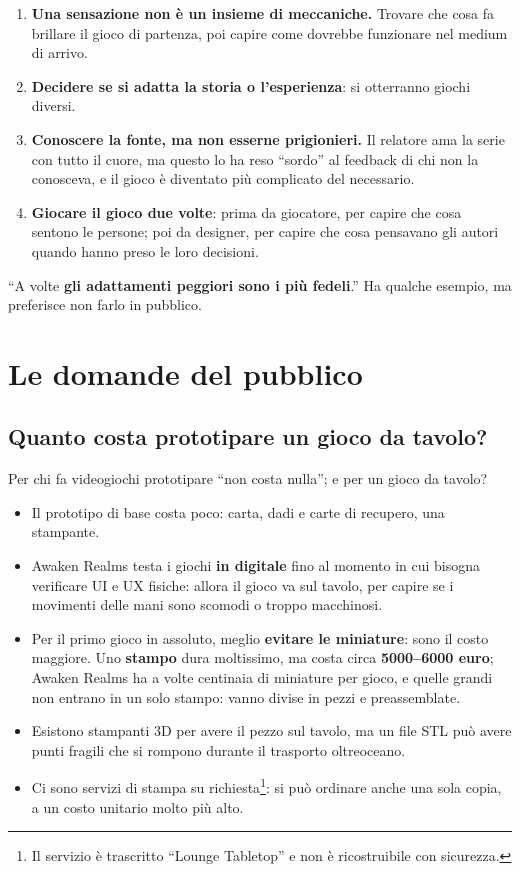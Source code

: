 \begin{enumerate}
  \item \textbf{Una sensazione non è un insieme di meccaniche.} Trovare che cosa fa
        brillare il gioco di partenza, poi capire come dovrebbe funzionare nel medium
        di arrivo.
  \item \textbf{Decidere se si adatta la storia o l'esperienza}: si otterranno giochi
        diversi.
  \item \textbf{Conoscere la fonte, ma non esserne prigionieri.} Il relatore ama la
        serie con tutto il cuore, ma questo lo ha reso ``sordo'' al feedback di chi
        non la conosceva, e il gioco è diventato più complicato del necessario.
  \item \textbf{Giocare il gioco due volte}: prima da giocatore, per capire che cosa
        sentono le persone; poi da designer, per capire che cosa pensavano gli
        autori quando hanno preso le loro decisioni.
\end{enumerate}
``A volte \textbf{gli adattamenti peggiori sono i più fedeli}.'' Ha qualche esempio,
ma preferisce non farlo in pubblico.

\section{Le domande del pubblico}
\label{sec:c3-5-domande}

\subsection{Quanto costa prototipare un gioco da tavolo?}

Per chi fa videogiochi prototipare ``non costa nulla''; e per un gioco da tavolo?
\begin{itemize}
  \item Il prototipo di base costa poco: carta, dadi e carte di recupero, una
        stampante.
  \item Awaken Realms testa i giochi \textbf{in digitale} fino al momento in cui
        bisogna verificare UI e UX fisiche: allora il gioco va sul tavolo, per
        capire se i movimenti delle mani sono scomodi o troppo macchinosi.
  \item Per il primo gioco in assoluto, meglio \textbf{evitare le miniature}: sono
        il costo maggiore. Uno \textbf{stampo} dura moltissimo, ma costa circa
        \textbf{5000--6000 euro}; Awaken Realms ha a volte centinaia di miniature per
        gioco, e quelle grandi non entrano in un solo stampo: vanno divise in pezzi
        e preassemblate.
  \item Esistono stampanti 3D per avere il pezzo sul tavolo, ma un file STL può avere
        punti fragili che si rompono durante il trasporto oltreoceano.
  \item Ci sono servizi di stampa su richiesta\footnote{Il servizio è trascritto
        ``Lounge Tabletop'' e non è ricostruibile con sicurezza.}: si può ordinare
        anche una sola copia, a un costo unitario molto più alto.
\end{itemize}

